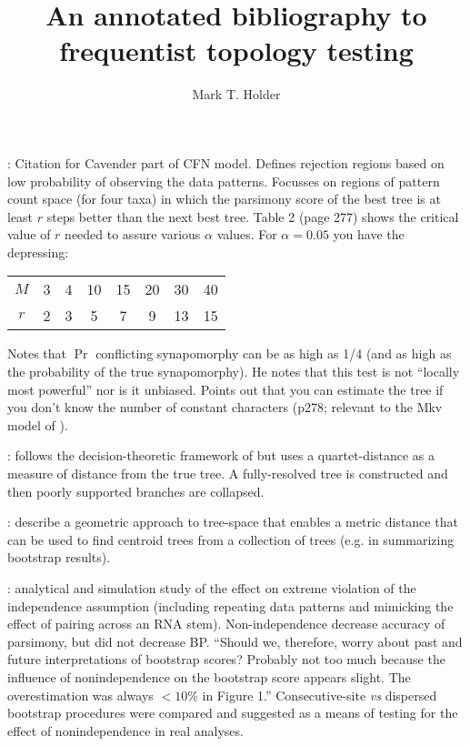 \documentclass[11pt]{article}
\title{An annotated bibliography to frequentist topology testing}
\author{Mark T. Holder}
\begin{document}
\maketitle

\citet{Cavender1978}:  Citation for Cavender part of CFN model.  Defines rejection regions based on low probability of observing the data patterns.  Focusses on regions of pattern count space (for four taxa) in which the parsimony score of the best tree is at least $r$ steps better than the next best tree.  Table 2 (page 277) shows the critical value of $r$ needed to assure various $\alpha$ values.  For $\alpha= 0.05$ you have the depressing:
\begin{center}
\begin{tabular}{cccccccc}
$M$ & 3 & 4 & 10 & 15 & 20 & 30 & 40 \\
$r$ & 2 & 3 & 5 & 7 & 9 & 13 & 15 
\end{tabular}
\end{center}
Notes that $\Pr$ conflicting synapomorphy can be as high as 1/4 (and as high as the probability of the true synapomorphy).  He notes that this test is not ``locally most powerful'' nor is it unbiased. Points out that you can estimate the tree if you don't know the number of constant characters (p278; relevant to the Mkv model of \citep{Lewis2001}).
        


\citet{BerryGC2000}: follows the decision-theoretic framework of \citet{BerryG1996} but uses a quartet-distance as a measure of distance from the true tree. A fully-resolved tree is constructed and then poorly supported branches are collapsed.

\citet{BilleraHV2001}: describe a geometric approach to tree-space that enables a metric distance that can be used to find centroid trees from a collection of trees (e.g. in summarizing bootstrap results).

\citet{Galtier2004}: analytical and simulation study of the effect on extreme violation of the independence assumption (including repeating data patterns and mimicking the effect of pairing across an RNA stem).  Non-independence decrease accuracy of parsimony, but did not decrease BP.  ``Should we, therefore, worry about past and future interpretations of bootstrap scores? Probably not too much because the influence of nonindependence on the bootstrap score appears slight. The overestimation was always $<10\%$ in Figure 1.''  Consecutive-site {\em vs} dispersed bootstrap procedures were compared and suggested as a means of testing for the effect of nonindependence in real analyses.
\end{document}
